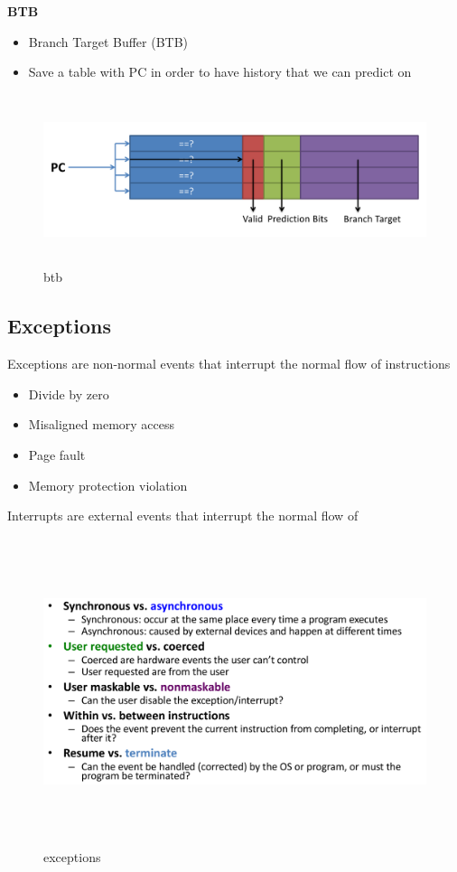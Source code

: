 \newpage

\textbf{BTB}
\begin{itemize}
\item  Branch Target Buffer (BTB)
\item  Save a table with PC in order to have history that we can predict on
\end{itemize}

\begin{figure}[h]
    \vspace{10mm}
    \centering
    \includegraphics[width=16cm, height=5cm]{image/btb.png} 
    \caption{btb}
\end{figure}


\newpage

\subsection{Exceptions}
Exceptions are non-normal events that interrupt the normal flow of instructions
\begin{itemize}
\item  Divide by zero
\item  Misaligned memory access
\item  Page fault
\item  Memory protection violation
\end{itemize}

Interrupts are external events that interrupt the normal flow of 

\begin{figure}[h]
    \vspace{10mm}
    \centering
    \includegraphics[width=16cm, height=9cm]{image/exceptions.png} 
    \caption{exceptions}
\end{figure}


